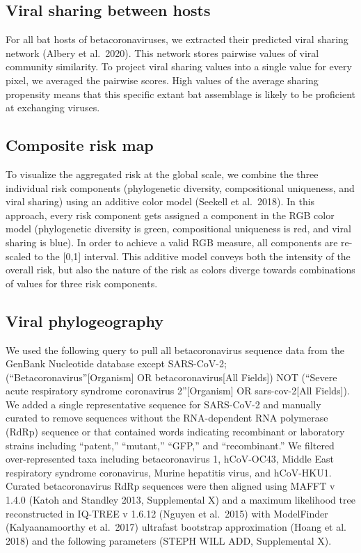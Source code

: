\documentclass[10pt,oneside]{article}
\begin{document}
\hypertarget{viral-sharing-between-hosts}{%
\subsection{Viral sharing between
hosts}\label{viral-sharing-between-hosts}}

For all bat hosts of betacoronaviruses, we extracted their predicted
viral sharing network (Albery et al.~2020). This network stores pairwise
values of viral community similarity. To project viral sharing values
into a single value for every pixel, we averaged the pairwise scores.
High values of the average sharing propensity means that this specific
extant bat assemblage is likely to be proficient at exchanging viruses.

\hypertarget{composite-risk-map}{%
\subsection{Composite risk map}\label{composite-risk-map}}

To visualize the aggregated risk at the global scale, we combine the
three individual risk components (phylogenetic diversity, compositional
uniqueness, and viral sharing) using an additive color model (Seekell et
al.~2018). In this approach, every risk component gets assigned a
component in the RGB color model (phylogenetic diversity is green,
compositional uniqueness is red, and viral sharing is blue). In order to
achieve a valid RGB measure, all components are re-scaled to the
{[}0,1{]} interval. This additive model conveys both the intensity of
the overall risk, but also the nature of the risk as colors diverge
towards combinations of values for three risk components.

\hypertarget{viral-phylogeography}{%
\subsection{Viral phylogeography}\label{viral-phylogeography}}

We used the following query to pull all betacoronavirus sequence data
from the GenBank Nucleotide database except SARS-CoV-2;
(``Betacoronavirus''{[}Organism{]} OR betacoronavirus{[}All Fields{]})
NOT (``Severe acute respiratory syndrome coronavirus 2''{[}Organism{]}
OR sars-cov-2{[}All Fields{]}). We added a single representative
sequence for SARS-CoV-2 and manually curated to remove sequences without
the RNA-dependent RNA polymerase (RdRp) sequence or that contained words
indicating recombinant or laboratory strains including ``patent,''
``mutant,'' ``GFP,'' and ``recombinant.'' We filtered over-represented
taxa including betacoronavirus 1, hCoV-OC43, Middle East respiratory
syndrome coronavirus, Murine hepatitis virus, and hCoV-HKU1. Curated
betacoronavirus RdRp sequences were then aligned using MAFFT v 1.4.0
(Katoh and Standley 2013, Supplemental X) and a maximum likelihood tree
reconstructed in IQ-TREE v 1.6.12 (Nguyen et al.~2015) with ModelFinder
(Kalyaanamoorthy et al.~2017) ultrafast bootstrap approximation (Hoang
et al. 2018) and the following parameters (STEPH WILL ADD, Supplemental
X).
\end{document}
